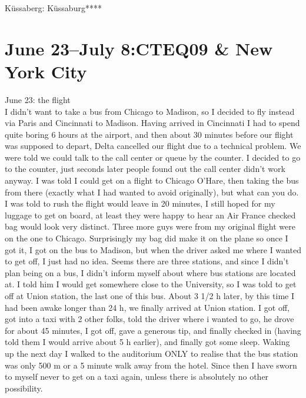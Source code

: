 K\"ussaberg: K\"ussaburg****

\section{June 23--July 8:CTEQ09 \& New York City}
\label{2009:US}

June 23: the flight\\
I didn't want to take a bus from Chicago to Madison, so I decided to fly instead via Paris and Cincinnati to Madison. Having arrived in Cincinnati I had to spend quite boring 6 hours at the airport, and then about 30 minutes before our flight was supposed to depart, Delta cancelled our flight due to a technical problem. We were told we could talk to the call center or queue by the counter. I decided to go to the counter, just seconds later people found out the call center didn't work anyway. I was told I could get on a flight to Chicago O'Hare, then taking the bus from there (exactly what I had wanted to avoid originally), but what can you do. I was told to rush the flight would leave in 20 minutes, I still hoped for my luggage to get on board, at least they were happy to hear an Air France checked bag would look very distinct. Three more guys were from my original flight were on the one to Chicago. Surprisingly my bag did make it on the plane so once I got it, I got on the bus to Madison, but when the driver asked me where I wanted to get off, I just had no idea. Seems there are three stations, and since I didn't plan being on a bus, I didn't inform myself about where bus stations are located at. I told him I would get somewhere close to the University, so I was told to get off at Union station, the last one of this bus. About 3 1/2 h later, by this time I had been awake longer than 24 h, we finally arrived at Union station. I got off, got into a taxi with 2 other folks, told the driver where i wanted to go, he drove for about 45 minutes, I got off, gave a generous tip, and finally checked in (having told them I would arrive about 5 h earlier), and finally got some sleep. Waking up the next day I walked to the auditorium ONLY to realise that the bus station was only 500 m or a 5 minute walk away from the hotel. Since then I have sworn to myself never to get on a taxi again, unless there is absolutely no other possibility.\\

